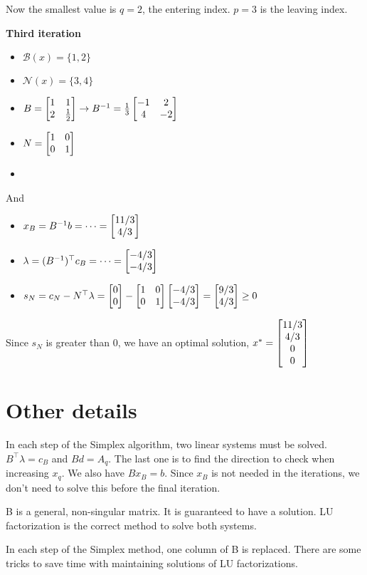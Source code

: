 \documentclass{article}
\begin{document}
Now the smallest value is $q = 2$, the entering index. $p = 3$ is the leaving index. 

\medskip \textbf{Third iteration}
\begin{itemize}
  \item $\mathcal{B}(x) = \{1, 2\}$
  \item $\mathcal{N}(x) = \{3, 4\}$
  \item $B = \begin{bmatrix} 1 & 1 \\ 2 &  \frac{1}{2} \end{bmatrix} \rightarrow B^{-1} = \frac{1}{3}\begin{bmatrix} -1 & 2 \\ 4 & -2 \end{bmatrix}$
  \item $N = \begin{bmatrix} 1 & 0 \\ 0 & 1 \end{bmatrix}$
  \item 
\end{itemize}
And
\begin{itemize}
  \item $x_B = B^{-1}b = \dots = \begin{bmatrix}  11 / 3  \\  4 / 3 \end{bmatrix}$
  \item $\lambda = (B^{-1})^{\top}c_B = \dots = \begin{bmatrix}  -4 / 3 \\ -4 / 3 \end{bmatrix}$
  \item $s_N = c_N -N^{\top}\lambda = \begin{bmatrix} 0 \\ 0 \end{bmatrix} - \begin{bmatrix} 1 & 0 \\ 0 & 1 \end{bmatrix}\begin{bmatrix} - 4 / 3  \\  -4 /3 \end{bmatrix} = \begin{bmatrix} 9 / 3 \\ 4 /3 \end{bmatrix} \geq 0$
\end{itemize}

Since $s_N$ is greater than 0, we have an optimal solution, $x^* = \begin{bmatrix} 11 /3  \\ 4 /3  \\  0  \\  0 \end{bmatrix}$

\section{Other details}

In each step of the Simplex algorithm, two linear systems must be solved. $B^{\top}\lambda = c_B$ and $Bd = A_q$. The last
one is to find the direction to check when increasing $x_q$. We also have $Bx_B = b$. Since $x_B$ is not needed in the iterations, we don't need
to solve this before the final iteration. 

\medskip B is a general, non-singular matrix. It is guaranteed to have a solution. LU factorization is the correct method to solve both systems.

\medskip In each step of the Simplex method, one column of B is replaced. There are some tricks to save time with maintaining solutions of LU factorizations.  
\end{document}
